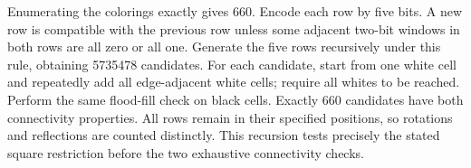 Enumerating the colorings exactly gives $\boxed{660}$. Encode each row by five bits. A new row is compatible with the previous row unless some adjacent two-bit windows in both rows are all zero or all one. Generate the five rows recursively under this rule, obtaining 5735478 candidates. For each candidate, start from one white cell and repeatedly add all edge-adjacent white cells; require all whites to be reached. Perform the same flood-fill check on black cells. Exactly 660 candidates have both connectivity properties. All rows remain in their specified positions, so rotations and reflections are counted distinctly. This recursion tests precisely the stated square restriction before the two exhaustive connectivity checks.
